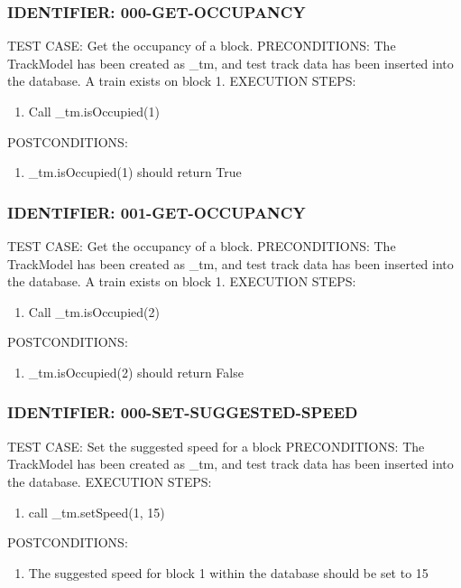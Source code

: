 \documentclass{scrreprt}
\begin{document}
\subsubsection{IDENTIFIER: 000-GET-OCCUPANCY}
TEST CASE: Get the occupancy of a block.
PRECONDITIONS: The TrackModel has been created as _tm, and test track data has been inserted into the database. A train exists on block 1.
EXECUTION STEPS:
\begin{enumerate}
	\item Call _tm.isOccupied(1)
\end{enumerate}
POSTCONDITIONS:
\begin{enumerate}
	\item _tm.isOccupied(1) should return True
\end{enumerate}

\subsubsection{IDENTIFIER: 001-GET-OCCUPANCY}
TEST CASE: Get the occupancy of a block.
PRECONDITIONS: The TrackModel has been created as _tm, and test track data has been inserted into the database. A train exists on block 1.
EXECUTION STEPS:
\begin{enumerate}
	\item Call _tm.isOccupied(2)
\end{enumerate}
POSTCONDITIONS:
\begin{enumerate}
	\item _tm.isOccupied(2) should return False
\end{enumerate}

\subsubsection{IDENTIFIER: 000-SET-SUGGESTED-SPEED}
TEST CASE: Set the suggested speed for a block
PRECONDITIONS: The TrackModel has been created as _tm, and test track data has been inserted into the database.
EXECUTION STEPS:
\begin{enumerate}
	\item call _tm.setSpeed(1, 15)
\end{enumerate}
POSTCONDITIONS:
\begin{enumerate}
	\item The suggested speed for block 1 within the database should be set to 15
\end{enumerate}
\end{document}
